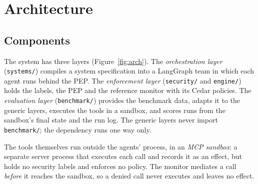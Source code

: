 \documentclass[11pt,a4paper]{article}
\DeclareRobustCommand{\code}[1]{{\renewcommand{\_}{\textunderscore\allowbreak}\texttt{#1}}}
\begin{document}
\section{Architecture}
\label{sec:arch}

\subsection{Components}

The system has three layers (Figure~\ref{fig:arch}). The \emph{orchestration layer}
(\code{systems/}) compiles a system specification into a LangGraph team in which each
agent runs behind the PEP. The \emph{enforcement layer} (\code{security/} and
\code{engine/}) holds the labels, the PEP and the reference monitor with its Cedar
policies. The \emph{evaluation layer} (\code{benchmark/}) provides the benchmark data,
adapts it to the generic layers, executes the tools in a sandbox, and scores runs from
the sandbox's final state and the run log. The generic layers never import
\code{benchmark/}; the dependency runs one way only.

The tools themselves run outside the agents' process, in an \emph{MCP sandbox}: a
separate server process that executes each call and records it as an effect, but holds
no security labels and enforces no policy. The monitor mediates a call \emph{before} it
reaches the sandbox, so a denied call never executes and leaves no effect.
\end{document}
